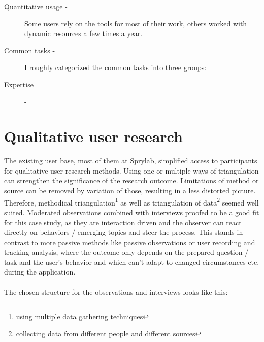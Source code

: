 \begin{description}
  \item[Quantitative usage -] Some users rely on the tools for most of their work, others worked with dynamic resources a few times a year.
  \item[Common tasks -] I roughly categorized the common tasks into three groups:
  \item[Expertise] -
\end{description}

\section{Qualitative user research}

The existing user base, most of them at Sprylab, simplified access to participants for qualitative user research methods.
Using one or multiple ways of triangulation \cite[p. 264]{Interactiondesign:2019ys} can strengthen the significance of the research outcome. Limitations of method or source can be removed by variation of those, resulting in a less distorted picture.
Therefore, methodical triangulation\footnote{using multiple data gathering techniques} as well as triangulation of data\footnote{collecting data from different people and different sources} seemed well suited.
Moderated observations combined with interviews proofed to be a good fit for this case study, as they are interaction driven and the observer can react directly on behaviors / emerging topics and steer the process.
This stands in contrast to more passive methods like passive observations or user recording and tracking analysis, where the outcome only depends on the
prepared question / task and the user's behavior and which can't adapt to changed circumstances etc. during the application.
\\\\
The chosen structure for the observations and interviews looks like this:

